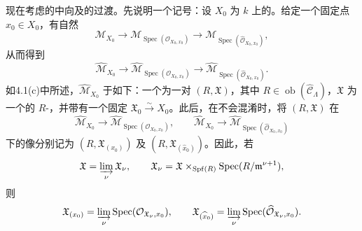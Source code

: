 现在考虑的中向及的过渡。先说明一个记号：设 $X_0$ 为 $k$ 上的。给定一个固定点 $x_0\in X_0$，有自然
\[
\mathcal M_{X_0}\longrightarrow\mathcal M_{\operatorname{Spec}(\mathcal O_{X_0,x_0})}
\longrightarrow\mathcal M_{\operatorname{Spec}(\widehat{\mathcal O}_{X_0,x_0})},
\]
从而得到
\[
\widehat{\mathcal M}_{X_0}\longrightarrow\widehat{\mathcal M}_{\operatorname{Spec}(\mathcal O_{X_0,x_0})}
\longrightarrow\widehat{\mathcal M}_{\operatorname{Spec}(\widehat{\mathcal O}_{X_0,x_0})}.
\]
如4.1(c)中所述，$\widehat{\mathcal M}_{X_0}$ 于如下：一个为一对 $(R,\mathfrak X)$，其中 $R\in\operatorname{ob}(\widehat{\mathcal C}_\Lambda)$，$\mathfrak X$ 为一个的 $R$-，并带有一个固定 $\mathfrak X_0\xrightarrow\sim X_0$。此后，在不会混淆时，将 $(R,\mathfrak X)$ 在
\[
\widehat{\mathcal M}_{X_0}\longrightarrow\widehat{\mathcal M}_{\operatorname{Spec}(\mathcal O_{X_0,x_0})},\qquad
\widehat{\mathcal M}_{X_0}\longrightarrow\widehat{\mathcal M}_{\operatorname{Spec}(\widehat{\mathcal O}_{X_0,x_0})}
\]
下的像分别记为 $(R,\mathfrak X_{(x_0)})$ 及 $(R,\mathfrak X_{(\widehat{x}_0)})$。因此，若
\[
\mathfrak X=\varinjlim_\nu\mathfrak X_\nu,\qquad
\mathfrak X_\nu=\mathfrak X\times_{\operatorname{Spf}(R)}\operatorname{Spec}(R/\mathfrak m^{\nu+1}),
\]
则
\[
\mathfrak X_{(x_0)}=\varinjlim_\nu\operatorname{Spec}(\mathcal O_{\mathfrak X_\nu,x_0}),\qquad
\mathfrak X_{(\widehat{x}_0)}=\varinjlim_\nu\operatorname{Spec}(\widehat{\mathcal O}_{\mathfrak X_\nu,x_0}).
\]

